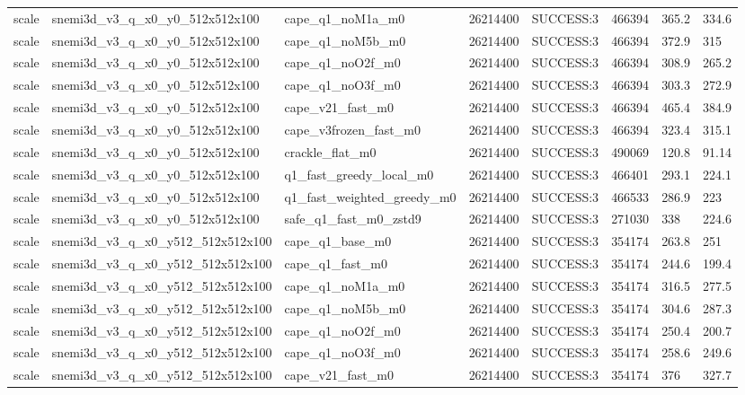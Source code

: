 \begin{table}[t]
\begin{tabular}{llllllll}
scale & snemi3d\_v3\_q\_x0\_y0\_512x512x100 & cape\_q1\_noM1a\_m0 & 26214400 & SUCCESS:3 & 466394 & 365.2 & 334.6 \\
scale & snemi3d\_v3\_q\_x0\_y0\_512x512x100 & cape\_q1\_noM5b\_m0 & 26214400 & SUCCESS:3 & 466394 & 372.9 & 315 \\
scale & snemi3d\_v3\_q\_x0\_y0\_512x512x100 & cape\_q1\_noO2f\_m0 & 26214400 & SUCCESS:3 & 466394 & 308.9 & 265.2 \\
scale & snemi3d\_v3\_q\_x0\_y0\_512x512x100 & cape\_q1\_noO3f\_m0 & 26214400 & SUCCESS:3 & 466394 & 303.3 & 272.9 \\
scale & snemi3d\_v3\_q\_x0\_y0\_512x512x100 & cape\_v21\_fast\_m0 & 26214400 & SUCCESS:3 & 466394 & 465.4 & 384.9 \\
scale & snemi3d\_v3\_q\_x0\_y0\_512x512x100 & cape\_v3frozen\_fast\_m0 & 26214400 & SUCCESS:3 & 466394 & 323.4 & 315.1 \\
scale & snemi3d\_v3\_q\_x0\_y0\_512x512x100 & crackle\_flat\_m0 & 26214400 & SUCCESS:3 & 490069 & 120.8 & 91.14 \\
scale & snemi3d\_v3\_q\_x0\_y0\_512x512x100 & q1\_fast\_greedy\_local\_m0 & 26214400 & SUCCESS:3 & 466401 & 293.1 & 224.1 \\
scale & snemi3d\_v3\_q\_x0\_y0\_512x512x100 & q1\_fast\_weighted\_greedy\_m0 & 26214400 & SUCCESS:3 & 466533 & 286.9 & 223 \\
scale & snemi3d\_v3\_q\_x0\_y0\_512x512x100 & safe\_q1\_fast\_m0\_zstd9 & 26214400 & SUCCESS:3 & 271030 & 338 & 224.6 \\
scale & snemi3d\_v3\_q\_x0\_y512\_512x512x100 & cape\_q1\_base\_m0 & 26214400 & SUCCESS:3 & 354174 & 263.8 & 251 \\
scale & snemi3d\_v3\_q\_x0\_y512\_512x512x100 & cape\_q1\_fast\_m0 & 26214400 & SUCCESS:3 & 354174 & 244.6 & 199.4 \\
scale & snemi3d\_v3\_q\_x0\_y512\_512x512x100 & cape\_q1\_noM1a\_m0 & 26214400 & SUCCESS:3 & 354174 & 316.5 & 277.5 \\
scale & snemi3d\_v3\_q\_x0\_y512\_512x512x100 & cape\_q1\_noM5b\_m0 & 26214400 & SUCCESS:3 & 354174 & 304.6 & 287.3 \\
scale & snemi3d\_v3\_q\_x0\_y512\_512x512x100 & cape\_q1\_noO2f\_m0 & 26214400 & SUCCESS:3 & 354174 & 250.4 & 200.7 \\
scale & snemi3d\_v3\_q\_x0\_y512\_512x512x100 & cape\_q1\_noO3f\_m0 & 26214400 & SUCCESS:3 & 354174 & 258.6 & 249.6 \\
scale & snemi3d\_v3\_q\_x0\_y512\_512x512x100 & cape\_v21\_fast\_m0 & 26214400 & SUCCESS:3 & 354174 & 376 & 327.7 \\

\end{tabular}
\end{table}
